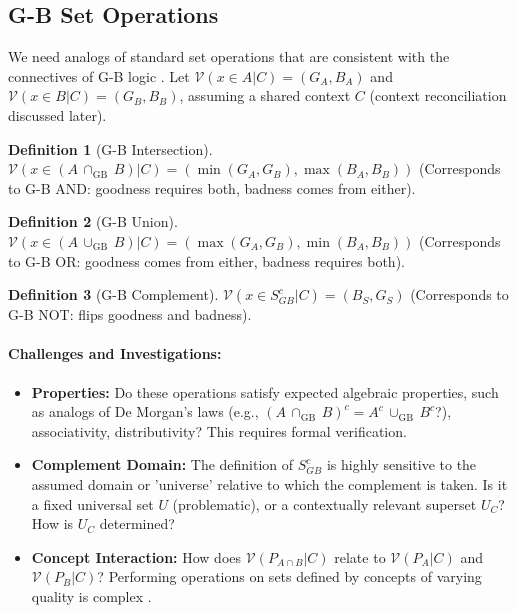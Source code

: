 \documentclass[11pt]{article}
\newcommand{\gbval}[1]{\mathcal{V}(#1)}         %
\newcommand{\pset}[1]{P_{#1}}                   %
\newcommand{\gbsetop}[1]{\,{#1}_{\mathrm{GB}}\,} %
\theoremstyle{definition}
\newtheorem{definition}{Definition}[section]
\theoremstyle{plain}
\begin{document}
\subsection{G-B Set Operations} \label{sec:gb_operations}
We need analogs of standard set operations that are consistent with the connectives of G-B logic \cite{gb_set_theory_outline, gb_logic_paper}. Let $\gbval{x \in A|C} = (G_A, B_A)$ and $\gbval{x \in B|C} = (G_B, B_B)$, assuming a shared context $C$ (context reconciliation discussed later).

\begin{definition}[G-B Intersection]
$ \gbval{x \in (A \gbsetop{\cap} B) | C} = (\min(G_A, G_B), \max(B_A, B_B)) $
(Corresponds to G-B AND: goodness requires both, badness comes from either).
\end{definition}

\begin{definition}[G-B Union]
$ \gbval{x \in (A \gbsetop{\cup} B) | C} = (\max(G_A, G_B), \min(B_A, B_B)) $
(Corresponds to G-B OR: goodness comes from either, badness requires both).
\end{definition}

\begin{definition}[G-B Complement]
$ \gbval{x \in S^c_{GB} | C} = (B_S, G_S) $
(Corresponds to G-B NOT: flips goodness and badness).
\end{definition}

\paragraph{Challenges and Investigations:}
\begin{itemize}
    \item \textbf{Properties:} Do these operations satisfy expected algebraic properties, such as analogs of De Morgan's laws (e.g., $(A \gbsetop{\cap} B)^c = A^c \gbsetop{\cup} B^c$?), associativity, distributivity? This requires formal verification.
    \item \textbf{Complement Domain:} The definition of $S^c_{GB}$ is highly sensitive to the assumed domain or 'universe' relative to which the complement is taken. Is it a fixed universal set $U$ (problematic), or a contextually relevant superset $U_C$? How is $U_C$ determined?
    \item \textbf{Concept Interaction:} How does $\gbval{\pset{A \cap B}|C}$ relate to $\gbval{\pset{A}|C}$ and $\gbval{\pset{B}|C}$? Performing operations on sets defined by concepts of varying quality is complex \cite{gb_set_theory_outline}.
\end{itemize}
\end{document}
